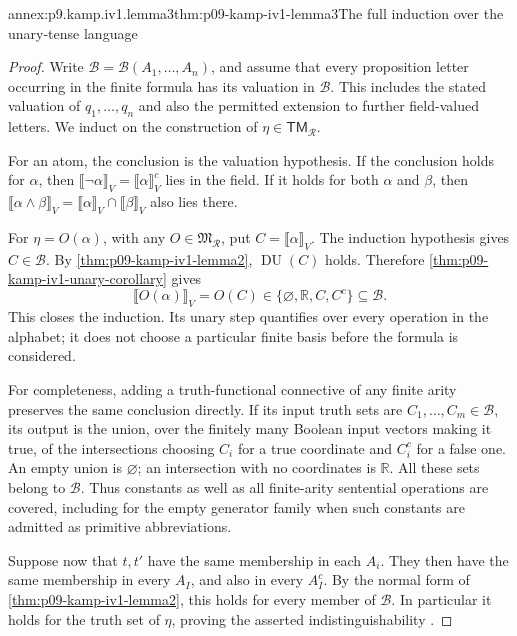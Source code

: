 \begin{annexitem}{annex:p9.kamp.iv1.lemma3}{thm:p09-kamp-iv1-lemma3}{The full induction over the unary-tense language}
\begin{proof}
Write \(\mathcal B=\mathcal B(A_1,\ldots,A_n)\), and
assume that every proposition letter occurring in the finite formula
has its valuation in \(\mathcal B\). This includes the stated
valuation of \(q_1,\ldots,q_n\) and also the permitted
extension to further field-valued letters. We induct on the
construction of \(\eta\in\mathsf{TM}_{\mathcal R}\).

For an atom, the conclusion is the valuation hypothesis. If the
conclusion holds for \(\alpha\), then
\(\llbracket\neg\alpha\rrbracket_V
 =\llbracket\alpha\rrbracket_V^c\) lies in the field.
If it holds for both \(\alpha\) and \(\beta\), then
\(\llbracket\alpha\land\beta\rrbracket_V
 =\llbracket\alpha\rrbracket_V\cap
   \llbracket\beta\rrbracket_V\) also lies there.

For \(\eta=O(\alpha)\), with any
\(O\in\mathfrak M_{\mathcal R}\), put
\(C=\llbracket\alpha\rrbracket_V\).
The induction hypothesis gives \(C\in\mathcal B\).
By \cref{thm:p09-kamp-iv1-lemma2},
\(\operatorname{DU}(C)\) holds. Therefore
\cref{thm:p09-kamp-iv1-unary-corollary} gives
\[
 \llbracket O(\alpha)\rrbracket_V
       =O(C)\in\{\varnothing,\mathbb R,C,C^c\}
                        \subseteq\mathcal B.
\]
This closes the induction. Its unary step quantifies over every
operation in the alphabet; it does not choose a particular finite
basis before the formula is considered.

For completeness, adding a truth-functional connective of any
finite arity preserves the same conclusion directly. If its input
truth sets are \(C_1,\ldots,C_m\in\mathcal B\), its output
is the union, over the finitely many Boolean input vectors making
it true, of the intersections choosing \(C_i\) for a true
coordinate and \(C_i^c\) for a false one. An empty union is
\(\varnothing\); an intersection with no coordinates is
\(\mathbb R\). All these sets belong to \(\mathcal B\).
Thus constants as well as all finite-arity sentential operations
are covered, including for the empty generator family when such
constants are admitted as primitive abbreviations.

Suppose now that \(t,t'\) have the same membership in each
\(A_i\). They then have the same membership in every
\(A_I\), and also in every \(A_I^c\). By the normal
form of \cref{thm:p09-kamp-iv1-lemma2}, this holds for every
member of \(\mathcal B\). In particular it holds for the
truth set of \(\eta\), proving the asserted indistinguishability
\cite[ch.~IV, lemma~3, p.~98]{Kamp1968}.
\end{proof}
\end{annexitem}

